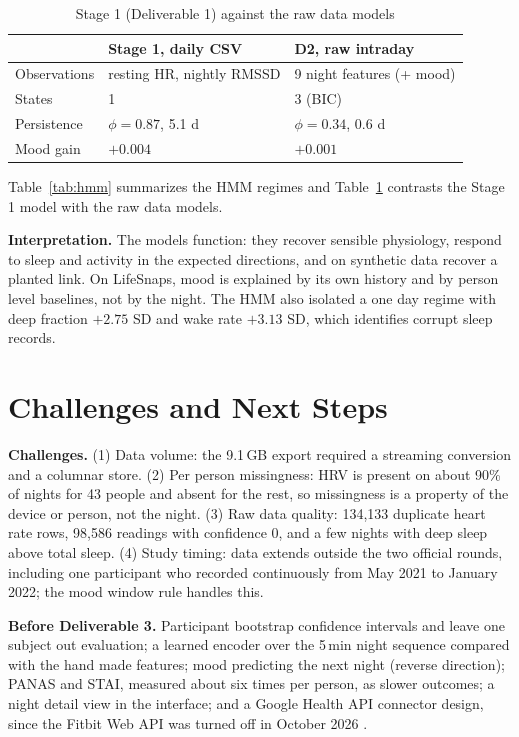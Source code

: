 \documentclass[10pt,twocolumn]{article}
\begin{document}
\begin{table}[h]
\centering\small
\caption{Stage 1 (Deliverable 1) against the raw data models}
\label{tab:cmp}
\begin{tabular}{p{2.2cm}p{2.5cm}p{2.3cm}}\toprule
& Stage 1, daily CSV & D2, raw intraday\\\midrule
Observations & resting HR, nightly RMSSD & 9 night features (+ mood)\\
States & 1 & 3 (BIC)\\
Persistence & $\phi{=}0.87$, 5.1 d & $\phi{=}0.34$, 0.6 d\\
Mood gain & $+0.004$ & $+0.001$\\\bottomrule
\end{tabular}
\end{table}

Table~\ref{tab:hmm} summarizes the HMM regimes and Table~\ref{tab:cmp} contrasts the Stage 1 model with the raw data models.

\textbf{Interpretation.} The models function: they recover sensible physiology, respond to sleep and activity in the expected directions, and on synthetic data recover a planted link. On LifeSnaps, mood is explained by its own history and by person level baselines, not by the night. The HMM also isolated a one day regime with deep fraction $+2.75$ SD and wake rate $+3.13$ SD, which identifies corrupt sleep records.

\section{Challenges and Next Steps}
\textbf{Challenges.} (1) Data volume: the 9.1\,GB export required a streaming conversion and a columnar store. (2) Per person missingness: HRV is present on about 90\% of nights for 43 people and absent for the rest, so missingness is a property of the device or person, not the night. (3) Raw data quality: 134{,}133 duplicate heart rate rows, 98{,}586 readings with confidence 0, and a few nights with deep sleep above total sleep. (4) Study timing: data extends outside the two official rounds, including one participant who recorded continuously from May 2021 to January 2022; the mood window rule handles this.

\textbf{Before Deliverable 3.} Participant bootstrap confidence intervals and leave one subject out evaluation; a learned encoder over the 5\,min night sequence compared with the hand made features; mood predicting the next night (reverse direction); PANAS and STAI, measured about six times per person, as slower outcomes; a night detail view in the interface; and a Google Health API connector design, since the Fitbit Web API was turned off in October 2026 \cite{ghapi}.
\end{document}
